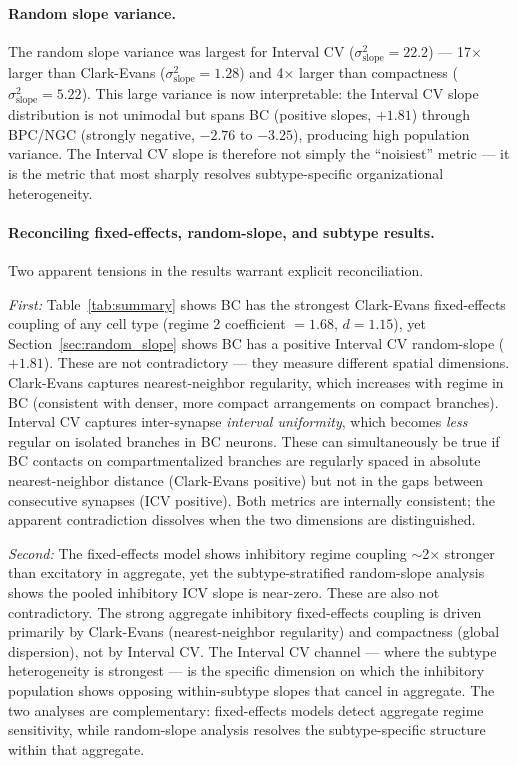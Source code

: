 \documentclass[11pt]{article}
\begin{document}
\paragraph{Random slope variance.} The random slope variance was largest for Interval CV ($\sigma^2_{\text{slope}} = 22.2$) --- 17$\times$ larger than Clark-Evans ($\sigma^2_{\text{slope}} = 1.28$) and 4$\times$ larger than compactness ($\sigma^2_{\text{slope}} = 5.22$). This large variance is now interpretable: the Interval CV slope distribution is not unimodal but spans BC (positive slopes, $+1.81$) through BPC/NGC (strongly negative, $-2.76$ to $-3.25$), producing high population variance. The Interval CV slope is therefore not simply the ``noisiest'' metric --- it is the metric that most sharply resolves subtype-specific organizational heterogeneity.

\paragraph{Reconciling fixed-effects, random-slope, and subtype results.} Two apparent tensions in the results warrant explicit reconciliation.

\textit{First:} Table~\ref{tab:summary} shows BC has the strongest Clark-Evans fixed-effects coupling of any cell type (regime 2 coefficient $= 1.68$, $d = 1.15$), yet Section~\ref{sec:random_slope} shows BC has a positive Interval CV random-slope ($+1.81$). These are not contradictory --- they measure different spatial dimensions. Clark-Evans captures nearest-neighbor regularity, which increases with regime in BC (consistent with denser, more compact arrangements on compact branches). Interval CV captures inter-synapse \textit{interval uniformity}, which becomes \textit{less} regular on isolated branches in BC neurons. These can simultaneously be true if BC contacts on compartmentalized branches are regularly spaced in absolute nearest-neighbor distance (Clark-Evans positive) but not in the gaps between consecutive synapses (ICV positive). Both metrics are internally consistent; the apparent contradiction dissolves when the two dimensions are distinguished.

\textit{Second:} The fixed-effects model shows inhibitory regime coupling $\sim$2$\times$ stronger than excitatory in aggregate, yet the subtype-stratified random-slope analysis shows the pooled inhibitory ICV slope is near-zero. These are also not contradictory. The strong aggregate inhibitory fixed-effects coupling is driven primarily by Clark-Evans (nearest-neighbor regularity) and compactness (global dispersion), not by Interval CV. The Interval CV channel --- where the subtype heterogeneity is strongest --- is the specific dimension on which the inhibitory population shows opposing within-subtype slopes that cancel in aggregate. The two analyses are complementary: fixed-effects models detect aggregate regime sensitivity, while random-slope analysis resolves the subtype-specific structure within that aggregate.
\end{document}
